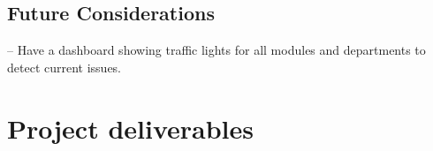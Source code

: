 \documentclass[11pt,fleqn,twoside]{article}
\begin{document}
\subsection{Future Considerations}
\begin{description}[itemsep=-0.25em,itemindent=-2em,leftmargin=4em]
	\item[Traffic Light Dashboard] -- Have a dashboard showing traffic lights for all modules and departments to detect current issues.
\end{description}



\section{Project deliverables}



\nocite{*} %

\newpage
{} 

%

\renewcommand{\refname}{Annotated Bibliography}  %
\end{document}
